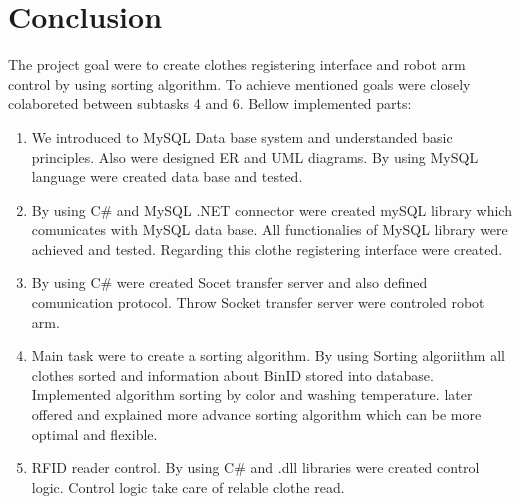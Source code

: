 \section{Conclusion}

The project goal were to create clothes registering interface and robot arm control by using sorting algorithm. To achieve mentioned goals were closely colaboreted between subtasks 4 and 6. Bellow implemented parts:
\begin{enumerate}
	\item We introduced to MySQL Data base system and understanded basic principles. Also were designed ER and UML diagrams. By using MySQL language were created data base and tested.
	\item By using C\# and MySQL .NET connector were created mySQL library which comunicates with MySQL data base. All functionalies of MySQL library were achieved and tested. Regarding this clothe registering interface were created.
	\item By using C\# were created Socet transfer server and also defined comunication protocol. Throw Socket transfer server were controled robot arm.
	\item Main task were to create a sorting algorithm. By using Sorting algoriithm all clothes sorted and information about BinID stored into database. Implemented algorithm sorting by color and washing temperature. later offered and explained more advance sorting algorithm which can be more optimal and flexible.
	\item RFID reader control. By using C\# and .dll libraries were created control logic. Control logic take care of relable clothe read.
\end{enumerate}
